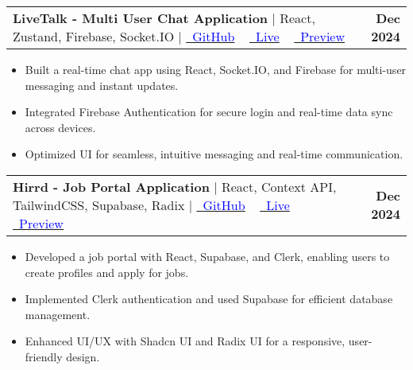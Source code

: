 \documentclass[letterpaper,11pt]{article}
\makeatletter
\newcommand{\resumeItem}[1]{
  \item\small{
    {#1 \vspace{-2pt}}
  }
}
\newcommand{\resumeProjectHeading}[2]{
    \item
    \begin{tabular*}{1.001\textwidth}{l@{\extracolsep{\fill}}r}
      \small#1 & \textbf{\small #2}\\
    \end{tabular*}\vspace{-7pt}
}
\newcommand{\resumeItemListStart}{\begin{itemize}}
\newcommand{\resumeItemListEnd}{\end{itemize}\vspace{-5pt}}
\makeatother
\begin{document}
          
      \resumeProjectHeading
          {\textbf{LiveTalk - Multi User Chat Application} $|$ {React, Zustand, Firebase, Socket.IO } $|$ {
          \href{https://github.com/s-satyajit/multi-user-chatApp}{\raisebox{-0.\height}\faGithub\ \underline{\textcolor{blue}{GitHub}}} ~ 
          \href{https://multi-user-chat.vercel.app/}{\raisebox{-0.\height}\faLaptopCode\ \underline{\textcolor{blue}{Live}}}} ~
          \href{https://www.linkedin.com/feed/update/urn:li:activity:7271581170591502339/}{\raisebox{-0.\height}\faLaptop\ \underline{\textcolor{blue}{Preview}}}
          }
          {Dec 2024}
          \resumeItemListStart
            \resumeItem{Built a real-time chat app using React, Socket.IO, and Firebase for multi-user messaging and instant updates.}
            \resumeItem{Integrated Firebase Authentication for secure login and real-time data sync across devices.}
            \resumeItem{Optimized UI for seamless, intuitive messaging and real-time communication.}
          \resumeItemListEnd 
          \vspace{-13pt}
          
          \resumeProjectHeading
          {\textbf{Hirrd - Job Portal Application} $|$ {React, Context API, TailwindCSS, Supabase, Radix} $|$ {
          \href{https://github.com/s-satyajit/hirrd-jobPortal}{\raisebox{-0.\height}\faGithub\ \underline{\textcolor{blue}{GitHub}}} ~ 
          \href{https://job-portal-eight-delta.vercel.app/}{\raisebox{-0.\height}\faLaptopCode\ \underline{\textcolor{blue}{Live}}}} ~
          \href{https://www.linkedin.com/feed/update/urn:li:activity:7269678588927336448/}{\raisebox{-0.\height}\faLaptop\ \underline{\textcolor{blue}{Preview}}}
          }
          {Dec 2024}
          \resumeItemListStart
            \resumeItem{Developed a job portal with React, Supabase, and Clerk, enabling users to create profiles and apply for jobs.}
            \resumeItem{Implemented Clerk authentication and used Supabase for efficient database management.}
            \resumeItem{Enhanced UI/UX with Shadcn UI and Radix UI for a responsive, user-friendly design.
}
          \resumeItemListEnd 
          \vspace{-13pt}
          
\end{document}
